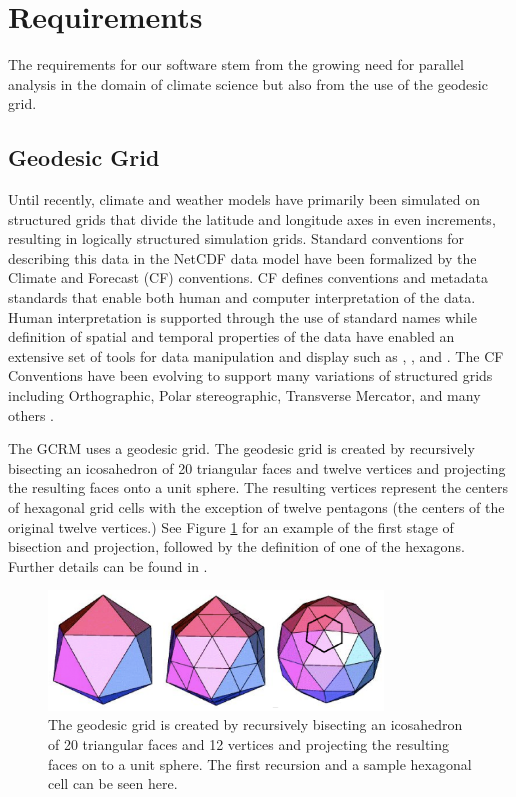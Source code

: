 \section{Requirements}
\label{section:requirements}

The requirements for our software stem from the growing need for parallel
analysis in the domain of climate science\cite{MODSIM07:LOT} but also from
the use of the geodesic grid.

\subsection{Geodesic Grid}
\label{subsection:grid}

Until recently, climate and weather models have primarily been simulated on
structured grids that divide the latitude and longitude axes in even
increments, resulting in logically structured simulation grids.  Standard
conventions for describing this data in the NetCDF data model have been
formalized by the Climate and Forecast (CF) conventions\cite{CF}.  CF defines
conventions and metadata standards that enable both human and computer
interpretation of the data.  Human interpretation is supported through the use
of standard names while definition of spatial and temporal properties of the
data have enabled an extensive set of tools for data manipulation and display
such as \cite{NCO}, \cite{OPeNDAP}, and \cite{FERRET}.  The CF Conventions
have been evolving to support many variations of structured grids including
Orthographic, Polar stereographic, Transverse Mercator, and many others . 

The GCRM uses a geodesic grid.  The geodesic grid is created by recursively
bisecting an icosahedron of 20 triangular faces and twelve vertices and
projecting the resulting faces onto a unit sphere.  The resulting vertices
represent the centers of hexagonal grid cells with the exception of twelve
pentagons (the centers of the original twelve vertices.) See Figure
\ref{fig:geodesic} for an example of the first stage of bisection and
projection, followed by the definition of one of the hexagons.  Further
details can be found in \cite{GEODESIC}.

\begin{figure}[!t]
\center
\includegraphics[width=3.5in]{images/geodesic2}
\caption{The geodesic grid is created by recursively bisecting an icosahedron
of 20 triangular faces and 12 vertices and projecting the resulting faces on
to a unit sphere.  The first recursion and a sample hexagonal cell can be seen
here.}
\label{fig:geodesic}
\end{figure}

